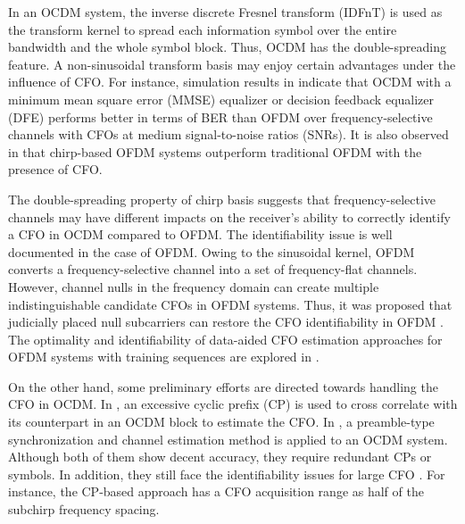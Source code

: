\documentclass[journal]{IEEEtran}
\begin{document}
In an OCDM system, the inverse discrete Fresnel transform (IDFnT) is used as the transform kernel to spread each information symbol over the entire bandwidth and the whole symbol block. Thus, OCDM has the double-spreading feature. A non-sinusoidal transform basis may enjoy certain advantages under the influence of CFO. For instance, simulation results in \cite{omar_performance_2021} indicate that OCDM with a minimum mean square error (MMSE) equalizer or decision feedback equalizer (DFE) performs better in terms of BER than OFDM over frequency-selective channels with CFOs at medium signal-to-noise ratios (SNRs). It is also observed in \cite{Trivedi} that chirp-based OFDM systems outperform traditional OFDM with the presence of CFO. 

The double-spreading property of chirp basis suggests that frequency-selective channels may have different impacts on the receiver's ability to correctly identify a CFO in OCDM compared to OFDM. The identifiability issue is well documented in the case of OFDM\cite{ma_non-data-aided_2001}. Owing to the sinusoidal kernel, OFDM converts a frequency-selective channel into a set of frequency-flat channels. However, channel nulls in the frequency domain can create multiple indistinguishable candidate CFOs in OFDM systems. Thus, it was proposed that judicially placed null subcarriers can restore the CFO identifiability in OFDM \cite{ma_non-data-aided_2001, Ghogho}. The optimality and identifiability of data-aided CFO estimation approaches for OFDM systems with training sequences are explored in \cite{gao, gao2}.


On the other hand, some preliminary efforts are directed towards handling the CFO in OCDM. In \cite{zhang_channel_2022}, an excessive cyclic prefix (CP) is used to cross correlate with its counterpart in an OCDM block to estimate the CFO. In \cite{filomeno_joint_2022}, a preamble-type synchronization and channel estimation method is applied to an OCDM system. Although both of them show decent accuracy, they require redundant CPs or symbols. In addition, they still face the identifiability issues for large CFO \cite{zhang_channel_2022,filomeno_joint_2022}. For instance, the CP-based approach \cite{zhang_channel_2022} has a CFO acquisition range as half of the subchirp frequency spacing.  
\end{document}
